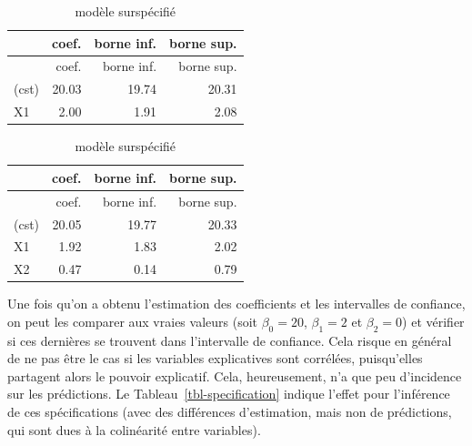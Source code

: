 \documentclass[
  11pt,
  letterpaper,
]{scrbook}
\theoremstyle{definition}
\theoremstyle{remark}
\begin{document}
\begin{table}

\caption{\label{tbl-specification}Surspécification de modèle de
régression linéaire pour des données simulées.}

\begin{minipage}{0.50\linewidth}

\begin{longtable}[]{@{}lrrr@{}}
\caption{modèle correct}\tabularnewline
\toprule\noalign{}
& coef. & borne inf. & borne sup. \\
\midrule\noalign{}
\endfirsthead
\toprule\noalign{}
& coef. & borne inf. & borne sup. \\
\midrule\noalign{}
\endhead
\bottomrule\noalign{}
\endlastfoot
(cst) & 20.03 & 19.74 & 20.31 \\
X1 & 2.00 & 1.91 & 2.08 \\
\end{longtable}

\end{minipage}%
%
\begin{minipage}{0.50\linewidth}

\begin{longtable}[]{@{}lrrr@{}}
\caption{modèle surspécifié}\tabularnewline
\toprule\noalign{}
& coef. & borne inf. & borne sup. \\
\midrule\noalign{}
\endfirsthead
\toprule\noalign{}
& coef. & borne inf. & borne sup. \\
\midrule\noalign{}
\endhead
\bottomrule\noalign{}
\endlastfoot
(cst) & 20.05 & 19.77 & 20.33 \\
X1 & 1.92 & 1.83 & 2.02 \\
X2 & 0.47 & 0.14 & 0.79 \\
\end{longtable}

\end{minipage}%

\end{table}%

Une fois qu'on a obtenu l'estimation des coefficients et les intervalles
de confiance, on peut les comparer aux vraies valeurs (soit
\(\beta_0 = 20\), \(\beta_1=2\) et \(\beta_2 = 0\)) et vérifier si ces
dernières se trouvent dans l'intervalle de confiance. Cela risque en
général de ne pas être le cas si les variables explicatives sont
corrélées, puisqu'elles partagent alors le pouvoir explicatif. Cela,
heureusement, n'a que peu d'incidence sur les prédictions. Le
Tableau~\ref{tbl-specification} indique l'effet pour l'inférence de ces
spécifications (avec des différences d'estimation, mais non de
prédictions, qui sont dues à la colinéarité entre variables).
\end{document}
